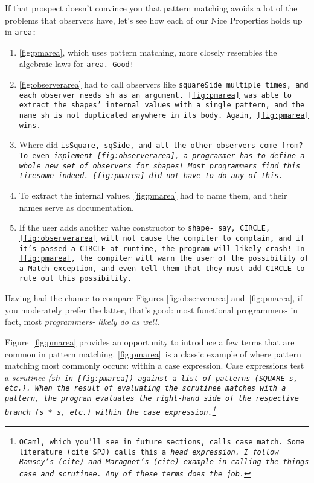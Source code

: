 \documentclass[manuscript,screen,review, 12pt, nonacm]{acmart}
\begin{document}
\begin{outline}[enumerate]
    If that prospect doesn't convince you that pattern matching avoids a lot of
    the problems that observers have, let's see how each of our Nice Properties
    holds up in \tt{area}: 
    
    \begin{enumerate}
        \item \ref{fig:pmarea}, which uses pattern matching, more closely
        resembles the algebraic laws for \tt{area}. Good! 
        \item \ref{fig:observerarea} had to call observers like \tt{squareSide}
        multiple times, and each observer needs \tt{sh} as an argument.
        \ref{fig:pmarea} was able to extract the \tt{shape}s' internal values
        with a single pattern, and the name \tt{sh} is not duplicated anywhere
        in its body. Again, \ref{fig:pmarea} wins. 
        \item Where did \tt{isSquare}, \tt{sqSide}, and all the other observers
        come from? To even \it{implement} \ref{fig:observerarea}, a programmer
        has to define a whole new set of observers for \tt{shape}s! Most
        programmers find this tiresome indeed. \ref{fig:pmarea} did not have to
        do any of this. 
        \item To extract the internal values, \ref{fig:pmarea} had to name them,
        and their names serve as documentation. 
        \item If the user adds another value constructor to \tt{shape}- say,
        \tt{CIRCLE}, \ref{fig:observerarea} will not cause the compiler to
        complain, and if it's passed a \tt{CIRCLE} at runtime, the program will
        likely crash! In \ref{fig:pmarea}, the compiler will warn the user of
        the possibility of a \tt{Match} exception, and even tell them that they
        must add \tt{CIRCLE} to rule out this possibility. 
    \end{enumerate}

    Having had the chance to compare Figures \ref{fig:observerarea}
    and~\ref{fig:pmarea}, if you moderately prefer the latter, that's good: most
    functional programmers- in fact, most \it{programmers}- likely do as well. 

    Figure~\ref{fig:pmarea} provides an opportunity to introduce a few terms
    that are common in pattern matching. \ref{fig:pmarea}~is a classic example
    of where pattern matching most commonly occurs: within a case expression.
    Case expressions test a \it{scrutinee} (\tt{sh} in~\ref{fig:pmarea}) against
    a list of patterns (\tt{SQUARE s}, etc.). When the result of evaluating the
    scrutinee matches with a pattern, the program evaluates the right-hand side
    of the respective branch (\tt{s * s}, etc.) within the case
    expression.\footnote{OCaml, which you'll see in future sections, calls case
    \tt{match}. Some literature (cite SPJ) calls this a \it{head expression}. I
    follow Ramsey's (cite) and Maragnet's (cite) example in calling the things
    \it{case} and \it{scrutinee}. Any of these terms does the job.} 


\end{outline}
\end{document}
